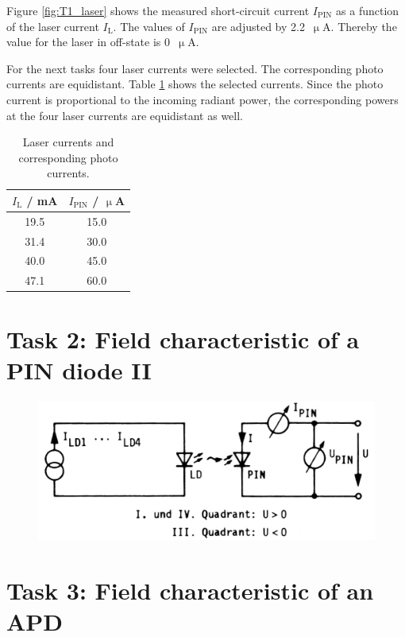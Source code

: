 Figure \ref{fig:T1_laser} shows the measured short-circuit current $I_{\mathrm{PIN}}$ as a function of the laser current $I_{\mathrm{L}}$. The values of $I_{\mathrm{PIN}}$ are adjusted by 2.2~$\upmu$A. Thereby the value for the laser in off-state is 0~$\upmu$A.


For the next tasks four laser currents were selected. The corresponding photo currents are equidistant. Table \ref{tab:T1_values} shows the selected currents. Since the photo current is proportional to the incoming radiant power, the corresponding powers at the four laser currents are equidistant as well.


\begin{table}%
\centering
\caption{Laser currents and corresponding photo currents.}

\begin{tabular}{cc}

\toprule
$I_{\mathrm{L}}$ / mA	&	$I_{\mathrm{PIN}}$ / $\upmu$A\\

\midrule

19.5&15.0\\
31.4&30.0\\
40.0&45.0\\
47.1&60.0\\
\bottomrule 
\end{tabular}
\label{tab:T1_values}
\end{table}

\section{Task 2: Field characteristic of a PIN diode II}

\begin{figure}%
\centering
\includegraphics[width=.6\columnwidth]{Grafiken/T2_setup.jpg}%
\caption{}%
\label{fig:T3_setup}%
\end{figure}

\section{Task 3: Field characteristic of an APD}

